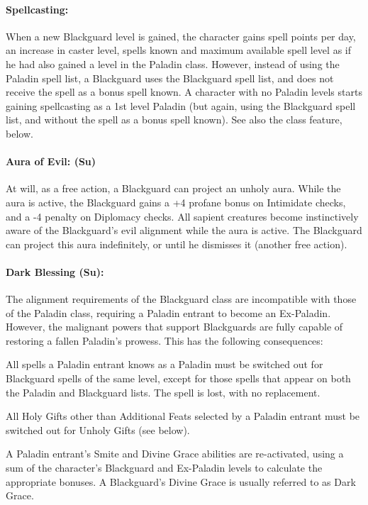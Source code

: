 \paragraph{Spellcasting:} When a new Blackguard level is gained, the character gains spell points per day, an increase in caster level, spells known and maximum available spell level as if he had also gained a level in the Paladin class. However, instead of using the Paladin spell list, a Blackguard uses the Blackguard spell list, and does not receive the  spell as a bonus spell known. A character with no Paladin levels starts gaining spellcasting as a 1st level Paladin (but again, using the Blackguard spell list, and without the  spell as a bonus spell known). See also the  class feature, below.

\paragraph{Aura of Evil: (Su)} 
At will, as a free action, a Blackguard can project an unholy aura.
While the aura is active, the Blackguard gains a +4 profane bonus on Intimidate checks, and a -4 penalty on Diplomacy checks.
All sapient creatures become instinctively aware of the Blackguard's evil alignment while the aura is active.
The Blackguard can project this aura indefinitely, or until he dismisses it (another free action). 

\paragraph[Dark Blessing]{Dark Blessing (Su):} 
\label{sec:DarkBlessing}
The alignment requirements of the Blackguard class are incompatible with those of the Paladin class, requiring a Paladin entrant to become an Ex-Paladin. However, the malignant powers that support Blackguards are fully capable of restoring a fallen Paladin's prowess. This has the following consequences:
\begin{list}{}{\leftmargin=1em}
 \item All spells a Paladin entrant knows as a Paladin must be switched out for Blackguard spells of the same level, except for those spells that appear on both the Paladin and Blackguard lists. The  spell is lost, with no replacement.
 \item All Holy Gifts other than Additional Feats selected by a Paladin entrant must be switched out for Unholy Gifts (see below).
 \item A Paladin entrant's Smite and Divine Grace abilities are re-activated, using a sum of the character's Blackguard and Ex-Paladin levels to calculate the appropriate bonuses. A Blackguard's Divine Grace is usually referred to as Dark Grace.
\end{list}

